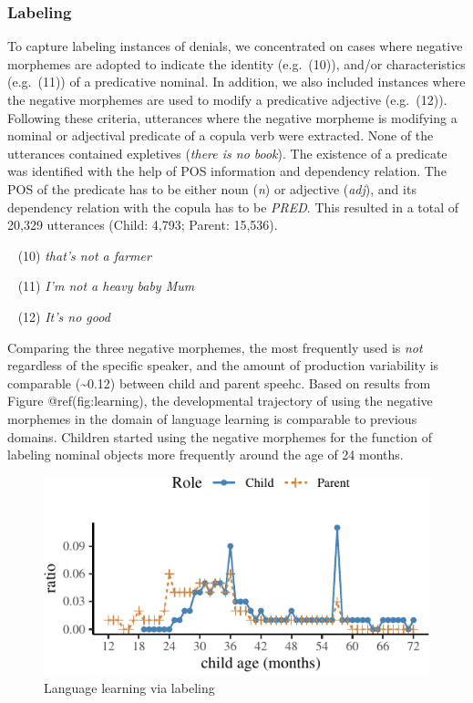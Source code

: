 \documentclass[10pt, letterpaper]{article}
\newenvironment{CodeChunk}{}{}
\begin{document}
\hypertarget{labeling}{%
\subsubsection{Labeling}\label{labeling}}

To capture labeling instances of denials, we concentrated on cases where
negative morphemes are adopted to indicate the identity (e.g.~(10)),
and/or characteristics (e.g.~(11)) of a predicative nominal. In
addition, we also included instances where the negative morphemes are
used to modify a predicative adjective (e.g.~(12)). Following these
criteria, utterances where the negative morpheme is modifying a nominal
or adjectival predicate of a copula verb were extracted. None of the
utterances contained expletives (\emph{there is no book}). The existence
of a predicate was identified with the help of POS information and
dependency relation. The POS of the predicate has to be either noun
(\emph{n}) or adjective (\emph{adj}), and its dependency relation with
the copula has to be \emph{PRED}. This resulted in a total of 20,329
utterances (Child: 4,793; Parent: 15,536).

~ (10) \emph{that's not a farmer}

~ (11) \emph{I'm not a heavy baby Mum}

~ (12) \emph{It's no good}

Comparing the three negative morphemes, the most frequently used is
\emph{not} regardless of the specific speaker, and the amount of
production variability is comparable (\textasciitilde0.12) between child
and parent speehc. Based on results from Figure @ref(fig:learning), the
developmental trajectory of using the negative morphemes in the domain
of language learning is comparable to previous domains. Children started
using the negative morphemes for the function of labeling nominal
objects more frequently around the age of 24 months.

\begin{CodeChunk}
\begin{figure}[H]

{\centering \includegraphics{figs/learning-1} 

}

\caption[Language learning via labeling]{Language learning via labeling}\label{fig:learning}
\end{figure}
\end{CodeChunk}
\end{document}
